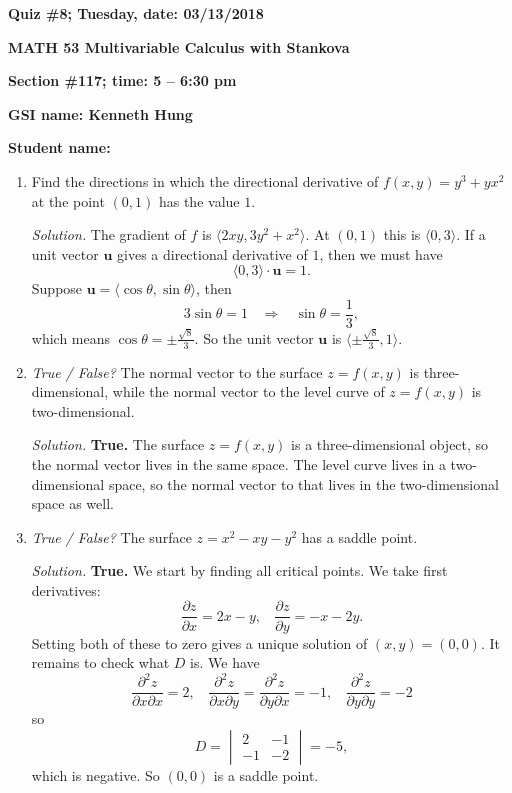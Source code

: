 \documentclass{article}
\begin{document}
{\bf Quiz \#8; Tuesday, date: 03/13/2018}

{\bf MATH 53 Multivariable Calculus with Stankova}

{\bf Section \#117; time: 5 -- 6:30 pm}

{\bf GSI name: Kenneth Hung}

{\bf Student name:}

\vspace*{0.25in}

\begin{enumerate}
\item Find the directions in which the directional derivative of $f(x, y) = y^3 + y x^2$ at the point $(0, 1)$ has the value $1$.

{\em Solution.} The gradient of $f$ is $\langle 2xy, 3y^2 + x^2\rangle$. At $(0, 1)$ this is $\langle 0, 3\rangle$. If a unit vector $\mathbf{u}$ gives a directional derivative of $1$, then we must have
\[
\langle 0, 3 \rangle \cdot \mathbf{u} = 1.
\]
Suppose $\mathbf{u} = \langle \cos \theta, \sin \theta\rangle$, then
\[
3 \sin \theta = 1 ~~~~ \Longrightarrow ~~~~ \sin \theta = \frac{1}{3},
\]
which means $\cos \theta = \pm \frac{\sqrt{8}}{3}$. So the unit vector $\mathbf{u}$ is $\langle \pm \frac{\sqrt{8}}{3}, 1 \rangle$.

\item {\em True / False?} The normal vector to the surface $z = f(x, y)$ is three-dimensional, while the normal vector to the level curve of $z = f(x, y)$ is two-dimensional.

{\em Solution.} {\bf True.} The surface $z = f(x, y)$ is a three-dimensional object, so the normal vector lives in the same space. The level curve lives in a two-dimensional space, so the normal vector to that lives in the two-dimensional space as well.

\item {\em True / False?} The surface $z = x^2 - xy - y^2$ has a saddle point.

{\em Solution.} {\bf True.} We start by finding all critical points. We take first derivatives:
\[
\frac{\partial z}{\partial x} = 2x - y, ~~~~ \frac{\partial z}{\partial y} = -x -2y.
\]
Setting both of these to zero gives a unique solution of $(x, y) = (0, 0)$. It remains to check what $D$ is. We have
\[
\frac{\partial^2 z}{\partial x \partial x} = 2, ~~~~ \frac{\partial^2 z}{\partial x \partial y} = \frac{\partial^2 z}{\partial y \partial x} = -1, ~~~~ \frac{\partial^2 z}{\partial y \partial y} = -2
\]
so
\[
D = \begin{vmatrix}
2 & -1 \\
-1 & -2
\end{vmatrix} = -5,
\]
which is negative. So $(0, 0)$ is a saddle point.
\end{enumerate}
\end{document}
